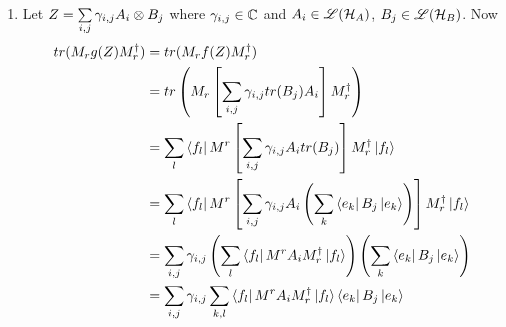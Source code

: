 \documentclass[a4paper, 11pt]{article}
\begin{document}
{\begin{enumerate}
	Let $\{\ket{c_l}\mid 1\leq l\leq L\}$ be an ONB of $\mcH_A$. Since $g(Z)\in \sL(\mcH_A)$ we the $(i,j)$th element of $g(Z)$ with respect to the basis $\{\ket{c_l}\mid 1\leq l\leq L\}$ is the value of $\bra{c_i}g(Z)\ket{c_j}$. Now Let $T=\sum\limits_{i,j}\gm_{i,j}A_i\tensor B_j$ then $\forall\ m,m\in [d_A]$ \begin{align*}
		\bra{c_m}g(T)\ket{c_n} & = \sum_k\bra{c_m\tensor e_k}T\ket{c_n\tensor e_k}                                           \\
		                       & = \sum_k\bra{c_m\tensor e_k}\lt[ \sum_{i,j}\gm_{i,j}A_i\tensor B_j \rt]\ket{c_n\tensor e_k} \\
		                       & = \sum_k\sum_{i,j}\gm_{i,j}\bra{c_m}A_i\ket{c_n}\bra{e_k}B_j\ket{e_k}                       \\
		                       & =\sum_{i,j}\gm_{i,j}\bra{c_m}A_i\ket{c_n} \sum_k\bra{e_k}B_j\ket{e_k}                       \\
		                       & = \sum_{i,j}\gm_{i,j}\bra{c_m}A_i\ket{c_n} tr(B_j)                                          \\
		                       & = \bra{c_m}\lt[ \sum_{i,j}\gm_{i,j}tr(B_j)A_i \rt]\ket{c_n}                                 \\
		                       & = \bra{c_m}f(T)\ket{c_n}
	\end{align*}Hence for all $m,n\in [d_A]$ we have $$\bra{c_m}g(T)\ket{c_n}=\bra{c_m}f(T)\ket{c_n}$$Hence $g(T)=f(T)$. Since $T$ is any arbitrary operator in $\sL(\mcH_A\tensor \mcH_B)$. Therefore we have $g(T)=f(T)$ for all $T\in \sL(\mcH_A\tensor \mcH_B)$. 
	\item Let $Z=\sum\limits_{i,j}\gamma_{i,j}A_i\otimes B_j$ where $\gamma_{i,j}\in \mathbb{C}$ and $A_i\in {\mathscr{L}}(\mathcal{H}_A)$, $B_j\in{\mathscr{L}}(\mathcal{H}_B)$. Now 
		\begin{align*}
			tr(M_rg(Z)M_r^{\dagger}) & = tr(M_rf(Z)M_r^{\dagger})\\
		& = tr\lt(M_r\lt[ \sum_{i,j}\gm_{i,j}tr(B_j)A_i \rt]M_r^{\dagger}\rt)\\
		& = \sum_{l}\bra{f_l}M^r\lt[ \sum_{i,j}\gm_{i,j}A_itr(B_j) \rt]M_r^{\dagger}\ket{f_l}\\
		& = \sum_{l}\bra{f_l}M^r\lt[ \sum_{i,j}\gm_{i,j}A_i\lt(\sum_k\bra{e_k}B_j\ket{e_k}\rt) \rt]M_r^{\dagger}\ket{f_l}\\
		& = \sum_{i,j}\gm_{i,j}\lt(\sum_{l}\bra{f_l}M^r A_iM_r^{\dagger}\ket{f_l}\rt)\lt(\sum_k\bra{e_k}B_j\ket{e_k}\rt)\\
		& = \sum_{i,j}\gm_{i,j}\sum_{k,l}\bra{f_l}M^r A_iM_r^{\dagger}\ket{f_l}\bra{e_k}B_j\ket{e_k}\\

\end{align*}
\end{enumerate}}
\end{document}
